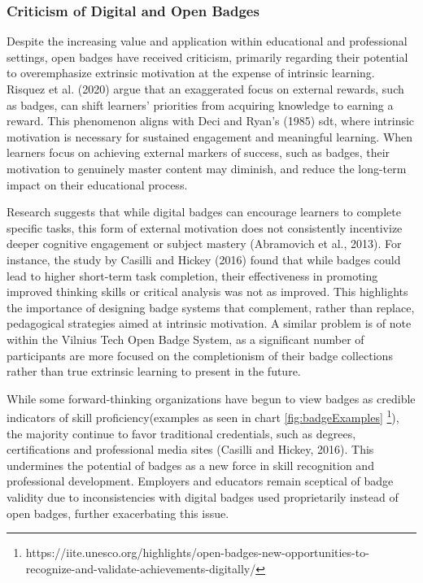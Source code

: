 \subsubsection{Criticism of Digital and Open Badges}
Despite the increasing value and application within educational and professional settings, open badges have received criticism, primarily regarding their potential to overemphasize extrinsic motivation at the expense of intrinsic learning. 
Risquez et al. (2020)\cite{risquez2020badge} argue that an exaggerated focus on external rewards, such as badges, can shift learners' priorities from acquiring knowledge to earning a reward. 
This phenomenon aligns with Deci and Ryan’s (1985)\cite{sdt} \acrshort{sdt}, where intrinsic motivation is necessary for sustained engagement and meaningful learning. 
When learners focus on achieving external markers of success, such as badges, their motivation to genuinely master content may diminish, and reduce the long-term impact on their educational process.

Research suggests that while digital badges can encourage learners to complete specific tasks, this form of external motivation does not consistently incentivize deeper cognitive engagement or subject mastery (Abramovich et al., 2013)\cite{areBadgesUseful}. 
For instance, the study by Casilli and Hickey (2016)\cite{credentialsBadges} found that while badges could lead to higher short-term task completion, their effectiveness in promoting improved thinking skills or critical analysis was not as improved. 
This highlights the importance of designing badge systems that complement, rather than replace, pedagogical strategies aimed at intrinsic motivation. 
A similar problem is of note within the Vilnius Tech Open Badge System, as a significant number of participants are more focused on the completionism of their badge collections rather than true extrinsic learning to present in the future.

While some forward-thinking organizations have begun to view badges as credible indicators of skill proficiency(examples as seen in chart \ref{fig:badgeExamples} \footnote{https://iite.unesco.org/highlights/open-badges-new-opportunities-to-recognize-and-validate-achievements-digitally/}), the majority continue to favor traditional credentials, such as degrees, certifications and professional media sites (Casilli and Hickey, 2016)\cite {credentialsBadges}. 
This undermines the potential of badges as a new force in skill recognition and professional development. 
Employers and educators remain sceptical of badge validity due to inconsistencies with digital badges used proprietarily instead of open badges, further exacerbating this issue.

